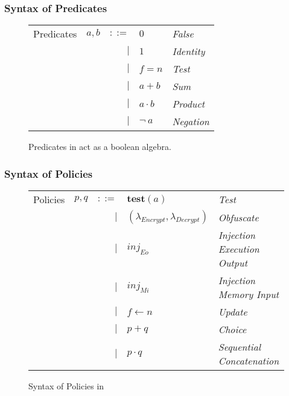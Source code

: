 \documentclass[sigconf,usenames,dvipsnames,svgnames,table]{acmart}
\begin{document}
      \subsubsection{Syntax of Predicates}\label{sec:spec:synt:pred}
        \begin{figure}
          \centering
          \begin{tabular}{l c r l l}
            Predicates  & $a,b$ & $::=$  & $0$          & \textit{False}    \\
                        &       & $\mid$ & $1$          & \textit{Identity} \\
                        &       & $\mid$ & $f = n$      & \textit{Test}     \\
                        &       & $\mid$ & $a + b$      & \textit{Sum}      \\
                        &       & $\mid$ & $a \cdot b$  & \textit{Product}  \\
                        &       & $\mid$ & $\neg\ a$    & \textit{Negation}
          \end{tabular}
          \caption{Predicates in \sysname act as a boolean algebra.}
          \label{fig:spec:synt:pred}
        \end{figure}

      \subsubsection{Syntax of Policies}\label{sec:spec:synt:pol}
        \begin{figure}
          \centering
          \begin{tabular}{l c r l l}
            Policies  & $p,q$ & $::=$  & $\mathbf{test}(a)$    & \textit{Test}     \\
                      &       & $\mid$ & $(\lambda_{Encrypt}, 
                                           \lambda_{Decrypt})$ & \textit{Obfuscate} \\
                      &       & $\mid$ & $inj_{Eo}$            & \textit{Injection Execution Output} \\
                      &       & $\mid$ & $inj_{Mi}$            & \textit{Injection Memory Input} \\
                      &       & $\mid$ & $f \leftarrow n$      & \textit{Update}   \\
                      &       & $\mid$ & $p + q$               & \textit{Choice}   \\
                      &       & $\mid$ & $p \cdot q$           & \textit{Sequential Concatenation} \\
          \end{tabular}
          \caption{Syntax of Policies in \sysname}
          \label{fig:spec:synt:pol}
        \end{figure}
\end{document}
